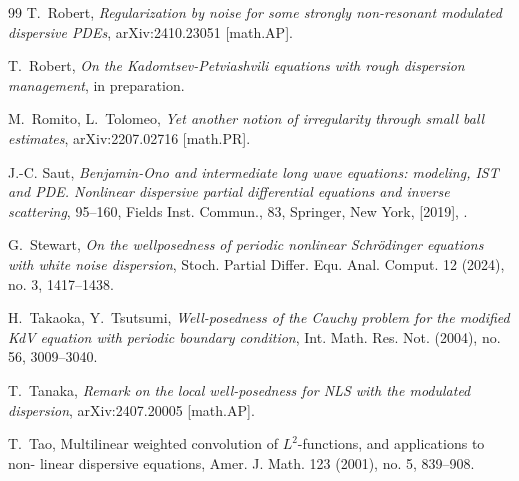 \documentclass[letterpaper, 11pt,  reqno]{amsart}
\newcommand{\1}{\hspace{0.5mm}\text{I}\hspace{0.5mm}}
\numberwithin{equation}{section}
\numberwithin{theorem}{section}
\begin{document}
\begin{thebibliography}{99}
T.~Robert, 
{\it Regularization by noise for some strongly non-resonant modulated dispersive PDEs}, 
arXiv:2410.23051 [math.AP].


T.~Robert, 
{\it  On the Kadomtsev-Petviashvili equations with rough dispersion management}, 
 in preparation.



M.~Romito, L.~Tolomeo, 
{\it Yet another notion of irregularity through small ball estimates},
arXiv:2207.02716 [math.PR].


	
J.-C. Saut,
 {\it Benjamin-Ono and intermediate long wave equations: modeling, IST and PDE. Nonlinear
dispersive partial differential equations and inverse scattering}, 
95--160, Fields Inst. Commun., 83, Springer, New York, [2019], .


G.~Stewart, 
{\it On the wellposedness of periodic nonlinear Schr\"odinger equations with white noise dispersion}, 
Stoch. Partial Differ. Equ. Anal. Comput. 12 (2024), no. 3, 1417--1438.


H.~Takaoka, Y.~Tsutsumi, 
{\it Well-posedness of the Cauchy problem for the modified KdV equation with periodic boundary condition},
 Int. Math. Res. Not. (2004), no. 56, 3009--3040. 




T.~Tanaka, 
{\it Remark on the local well-posedness for NLS with the modulated dispersion}, 
arXiv:2407.20005 [math.AP].


T.~Tao, 
{Multilinear weighted convolution of $L^2$-functions, and applications to non-
linear dispersive equations}, Amer. J. Math. 123 (2001), no. 5, 839--908.








\end{thebibliography}
\end{document}
